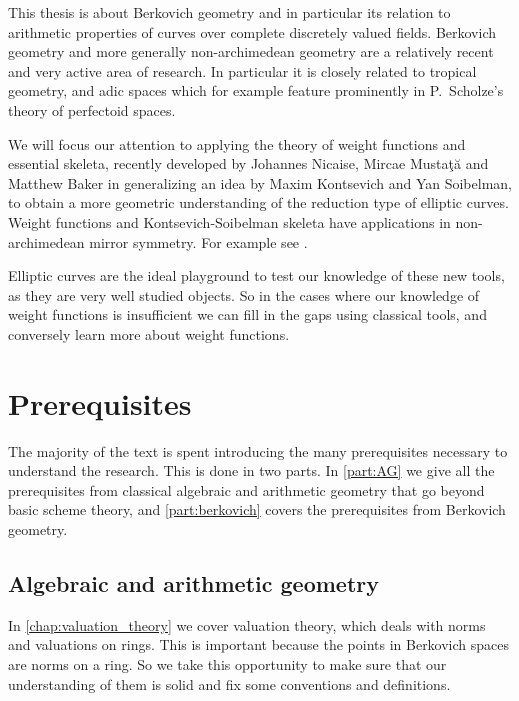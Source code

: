 This thesis is about Berkovich geometry and in particular its relation to arithmetic properties of curves over complete discretely valued fields. 
Berkovich geometry and more generally non-archimedean geometry are a relatively recent and very active area of research. 
In particular it is closely related to tropical geometry, and adic spaces which for example feature prominently in P.\ Scholze's theory of perfectoid spaces. 

We will focus our attention to applying the theory of weight functions and essential skeleta, recently developed by Johannes Nicaise, Mircae Mustaţă and Matthew Baker in \cite{mustataWeightFunctionsNonArchimedean2015,nicaiseBerkovichSkeletaBirational2016,bakerWeightFunctionsBerkovich2016} generalizing an idea by Maxim Kontsevich and Yan Soibelman, to obtain a more geometric understanding of the reduction type of elliptic curves. 
Weight functions and Kontsevich-Soibelman skeleta have applications in non-archimedean mirror symmetry. For example see \cite{nicaiseNonarchimedeanSYZFibration2019,kontsevichAffineStructuresNonArchimedean2006,brownEssentialSkeletonProduct2019}.

Elliptic curves are the ideal playground to test our knowledge of these new tools, as they are very well studied objects.
So in the cases where our knowledge of weight functions is insufficient we can fill in the gaps using classical tools, and conversely learn more about weight functions. 

\medskip
\section{Prerequisites} \label{sec:prerequisites}

The majority of the text is spent introducing the many prerequisites necessary to understand the research.  
This is done in two parts. 
In \cref{part:AG} we give all the prerequisites from classical algebraic and arithmetic geometry that go beyond basic scheme theory, and \cref{part:berkovich} covers the prerequisites from Berkovich geometry. 

\subsection{Algebraic and arithmetic geometry} \label{sec:algebraic_and_arithmetic_geometry}
In \cref{chap:valuation_theory} we cover valuation theory, which deals with norms and valuations on rings. 
This is important because the points in Berkovich spaces are norms on a ring. 
So we take this opportunity to make sure that our understanding of them is solid and fix some conventions and definitions. 

